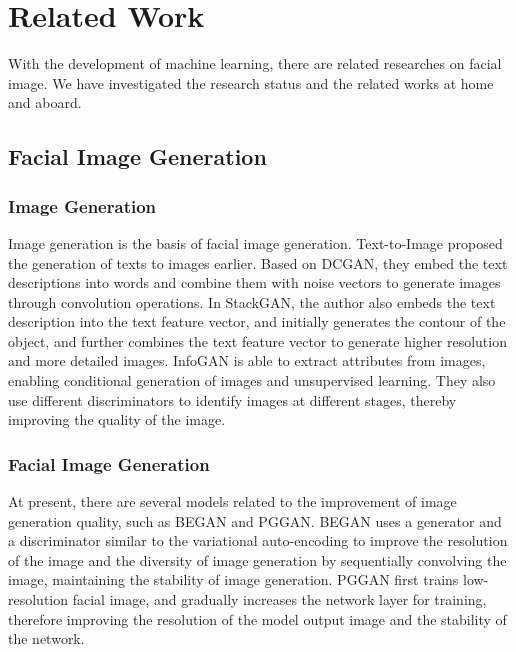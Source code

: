 \section{Related Work}


With the development of machine learning, there are related researches on facial image.
We have investigated the research status and the related works at home and aboard.

\subsection{Facial Image Generation}

\subsubsection*{Image Generation}

Image generation is the basis of facial image generation.
Text-to-Image proposed the generation of texts to images earlier.
Based on DCGAN, they embed the text descriptions into words and combine them with noise vectors to generate images through convolution operations.
In StackGAN, the author also embeds the text description into the text feature vector,
    and initially generates the contour of the object,
    and further combines the text feature vector to generate higher resolution and more detailed images.
    InfoGAN is able to extract attributes from images, enabling conditional generation of images and unsupervised learning.
They also use different discriminators to identify images at different stages, thereby improving the quality of the image.


\subsubsection*{Facial Image Generation}

At present, there are several models related to the improvement of image generation quality,
    such as BEGAN and PGGAN.
BEGAN uses a generator and a discriminator similar to the variational auto-encoding to improve the resolution of the image and the diversity of image generation by sequentially convolving the image,
    maintaining the stability of image generation.
PGGAN first trains low-resolution facial image,
    and gradually increases the network layer for training,
    therefore improving the resolution of the model output image and the stability of the network.



